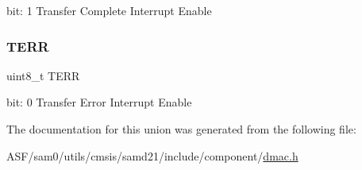 bit\+: 1 Transfer Complete Interrupt Enable \mbox{\label{union_d_m_a_c___c_h_i_n_t_e_n_c_l_r___type_aec94f800e27f13d8235935c375e2c7c2}} 
\subsubsection{\texorpdfstring{TERR}{TERR}}
{\footnotesize\ttfamily uint8\+\_\+t T\+E\+RR}

bit\+: 0 Transfer Error Interrupt Enable 

The documentation for this union was generated from the following file\+:\begin{DoxyCompactItemize}
\item 
A\+S\+F/sam0/utils/cmsis/samd21/include/component/\mbox{\hyperlink{component_2dmac_8h}{dmac.\+h}}\end{DoxyCompactItemize}
